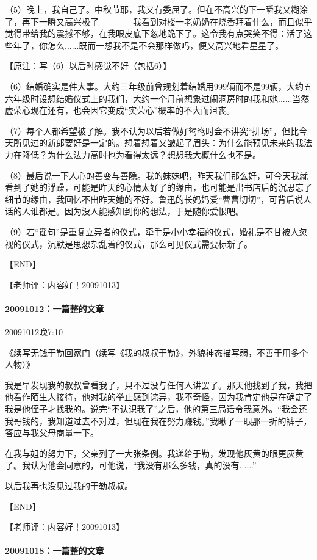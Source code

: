 \documentclass[UTF8]{Diaries}
\begin{document}
（5）晚上，我自己了。中秋节耶，我又有委屈了。但在不高兴的下一瞬我又糊涂了，再下一瞬又高兴极了————我看到对楼一老奶奶在烧香拜着什么，而且似乎觉得带给我的震撼不够，在我眼皮底下忽地跪下了。这令我有点哭笑不得：活了这些年了，你怎么......既而一想我不是不会那样做吗，便又高兴地看星星了。

【原注：写（6）以后时感觉不好（包括6）】

（6）结婚确实是件大事。大约三年级前曾规划着结婚用999辆而不是99辆，大约五六年级时设想结婚仪式上的我们，大约一个月前想象过闹洞房时的我和她......当然虚荣心现在还有，也会因它变成“实荣心”概率的不大而沮丧。

（7）每个人都希望被了解。我不认为以后若做好鸳鸯时会不讲究“排场”，但比今天所见过的新郎要好是一定的。想着想着又皱起了眉头：为什么能预见未来的我法力在降低？为什么法力高时也为看得太远？想想我大概什么也不是。

（8）最后说一下人心的善变与善隐。我的妹妹吧，昨天我们那么好，可今天我就看到了她的浮躁，可能是昨天的心情太好了的缘由，也可能是出书店后的沉思忘了细节的缘由，我回忆不出昨天她的不好。鲁迅的长妈妈爱“曹曹切切”，可背后说人话的人谁都是。因为没人能感知到你的想法，于是随你爱恨吧。

（9）若“谣句”是重复立异者的仪式，牵手是小小幸福的仪式，婚礼是不甘被人忽视的仪式，沉默是思想杂乱着的仪式，那么可见仪式需要标新了。

【END】

【老师评：内容好！20091013】


\paragraph{20091012：一篇整的文章}
20091012晚7:10

《续写无钱于勒回家门（续写《我的叔叔于勒》，外貌神态描写弱，不善于用多个人物）》

我是早发现我的叔叔曾看我了，只不过没与任何人讲罢了。那天他找到了我，我把他看作陌生人接待，他对我的举止感到诧异，我不奇怪，因为我肯定他是在确定了我是他侄子才找我的。说完“不认识我了”之后，他的第三局话令我意外。“我会还我哥钱的，我知道过去不对过，但现在我在努力赚钱。”我瞅了一眼那一折的裤子，答应与我父母商量一下。

在我与姐的努力下，父亲列了一大张条例。我递给于勒，发现他灰黄的眼更灰黄了。我认为他会同意的，可他说，“我没有那么多钱，真的没有......”

以后我再也没见过我的于勒叔叔。

【END】

【老师评：内容好！20091013】


\paragraph{20091018：一篇整的文章}
\end{document}
